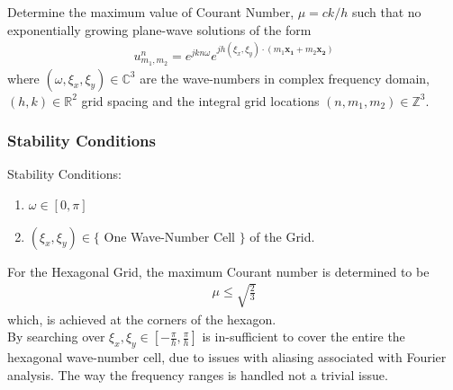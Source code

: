 \documentclass{beamer}
\begin{document}
\begin{frame}
Determine the maximum value of Courant Number, $\mu = ck/h$ such that no exponentially growing plane-wave solutions of the form
\begin{align*}
u^{n}_{m_1, m_2} = e^{jk n\omega } e^{jh (\xi_x, \xi_y)\cdot(m_1 \mathbf{x_1}+ m_2 \mathbf{x_2})}
\end{align*}
where $(\omega, \xi_x, \xi_y) \in \mathbb{C}^3$ are the wave-numbers in complex frequency domain, $(h,k) \in  \mathbb{R}^2$ grid spacing and the integral grid locations $(n,m_1,m_2) \in \mathbb{Z}^3$.

\end{frame}

\begin{frame}
\frametitle{Stability Conditions}

Stability Conditions:
\begin{enumerate}
\item $\omega \in [0,\pi]$
\item $(\xi_x, \xi_y) \in \{$ One Wave-Number Cell $\}$ of the Grid. 
\end{enumerate}


For the Hexagonal Grid, the maximum Courant number is determined to be 
\begin{align}
\mu \leq \sqrt{\frac{2}{3}}
\end{align}
which, is achieved at the corners of the hexagon. \\

By searching over $ \xi_x, \xi_y \in [-\frac{\pi}{h},\frac{\pi}{h}]$ is in-sufficient to cover the entire the hexagonal wave-number cell, due to issues with aliasing associated with Fourier analysis. The way the frequency ranges is handled not a trivial issue. 
\end{frame}

\end{document}
